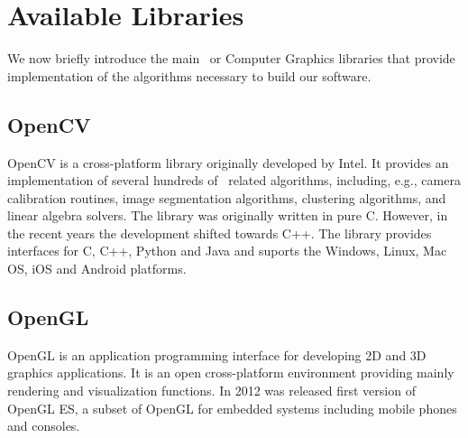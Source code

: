 \section{Available Libraries}
\label{lib} 

We now briefly introduce the main \cv\ or Computer Graphics libraries that provide implementation of the algorithms necessary to build our software. %


\subsection{OpenCV} 

OpenCV  is a cross-platform library originally developed by Intel. 
It provides an implementation of several hundreds of \cv\ related algorithms, 
including, e.g., camera calibration routines, image segmentation algorithms, clustering algorithms, and linear algebra solvers.
The library was originally written in pure C. 
However, in the recent years the development shifted towards C++. 
The library provides interfaces for C, C++, Python and Java and suports the Windows, Linux, Mac OS, iOS and Android platforms. 


\subsection{OpenGL} 

OpenGL is an application programming interface for developing 2D and 3D graphics applications.
It is an open cross-platform environment providing mainly rendering and visualization functions.
In 2012 was released first version of OpenGL ES, a subset of OpenGL for embedded systems including mobile phones and consoles.




















